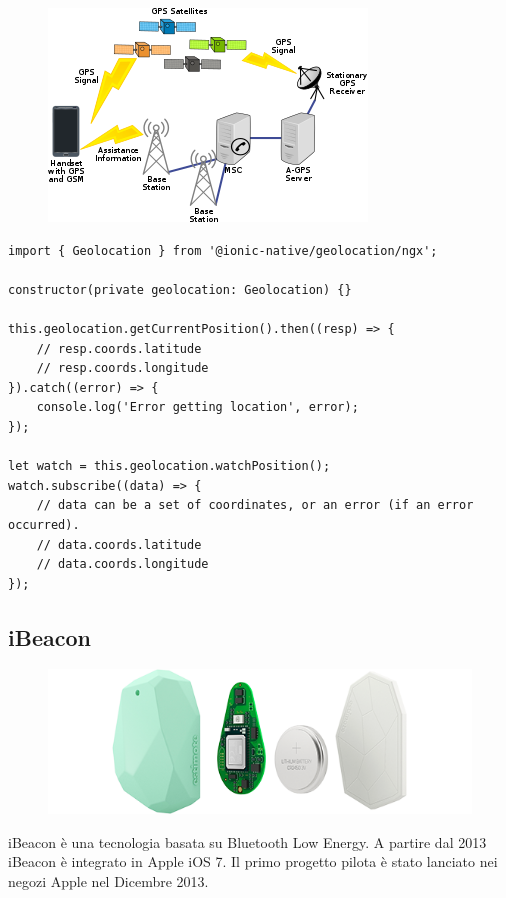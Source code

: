\begin{figure}[H]
    \centering  
    \includegraphics[scale=0.6]{img/cap2/gps}
\end{figure}

\begin{lstlisting}
import { Geolocation } from '@ionic-native/geolocation/ngx';

constructor(private geolocation: Geolocation) {}

this.geolocation.getCurrentPosition().then((resp) => {
    // resp.coords.latitude
    // resp.coords.longitude
}).catch((error) => {
    console.log('Error getting location', error);
});

let watch = this.geolocation.watchPosition();
watch.subscribe((data) => {
    // data can be a set of coordinates, or an error (if an error occurred).
    // data.coords.latitude
    // data.coords.longitude
});
\end{lstlisting}

\subsection{iBeacon}

\begin{figure}[H]
    \centering  
    \includegraphics[scale=0.3]{img/cap2/beacon}
\end{figure}

iBeacon è una tecnologia basata su Bluetooth Low Energy. A partire dal 2013 iBeacon è 
integrato in Apple iOS 7. Il primo progetto pilota è stato lanciato nei negozi Apple nel
Dicembre 2013.

